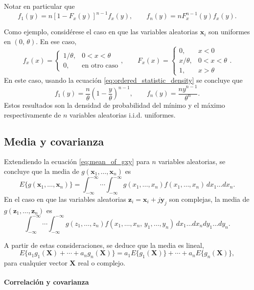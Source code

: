 \documentclass[a4paper]{report}
\newcommand{\X}{\mathbf{X}}
\newcommand{\x}{\mathbf{x}}
\newcommand{\y}{\mathbf{y}}
\newcommand{\z}{\mathbf{z}}
\begin{document}
Notar en particular que
\[
 f_1(y)=n[1-F_x(y)]^{n-1}f_x(y),\qquad f_n(y)=nF_x^{n-1}(y)f_x(y).
\]

Como ejemplo, considérese el caso en que las variables aleatorias \(\x_i\) son uniformes en \((0,\,\theta)\). En ese caso,
\[
 f_x(x)
 =\left\{\begin{array}{ll}
   1/\theta, & 0<x<\theta\\ 
   0, & \textrm{en otro caso}
 \end{array} \right.,
 \qquad
 F_x(x)
 =\left\{\begin{array}{ll}
   0, & x<0\\
   x/\theta, & 0<x<\theta\\ 
   1, & x>\theta
 \end{array} \right..
\]
En este caso, usando la ecuación \ref{eq:ordered_statistic_density} se concluye que
\begin{equation}\label{eq:ordered_statistic_uniform_density}
  f_1(y)=\frac{n}{\theta}\left(1-\frac{y}{\theta}\right)^{n-1},\qquad f_n(y)=\frac{ny^{n-1}}{\theta^n}. 
\end{equation}
Estos resultados son la densidad de probabilidad del mínimo y el máximo respectivamente de \(n\) variables aleatorias i.i.d. uniformes.

\subsection{Media y covarianza}\label{sec:mean_and_covariance}

Extendiendo la ecuación \ref{eq:mean_of_gxy} para \(n\) variables aleatorias, se concluye que la media de \(g(\x_1,\dots,\x_n)\) es
\[
 E\{g(\x_1,\dots,\x_n)\}=\int_{-\infty}^{-\infty}\cdots\int_{-\infty}^{-\infty}g(x_1,\dots,x_n)f(x_1,\dots,x_n)\,dx_1\dots dx_n.
\]
En el caso en que las variables aleatorias \(\z_i=\x_i+j\y_j\) son complejas, la media de \(g(\z_1,\dots,\z_n)\) es
\[
 \int_{-\infty}^{-\infty}\cdots\int_{-\infty}^{-\infty}g(z_1,\dots,z_n)f(x_1,\dots,x_n,\,y_1,\dots,y_n)\,dx_1\dots dx_ndy_1\dots dy_n.
\]

A partir de estas consideraciones, se deduce que la media es lineal, 
\[
 E\{a_1g_1(\X)+\cdots+a_ng_n(\X)\}=a_1E\{g_1(\X)\}+\cdots+a_nE\{g_n(\X)\},
\]
para cualquier vector \(\X\) real o complejo.

\paragraph{Correlación y covarianza}
\end{document}
